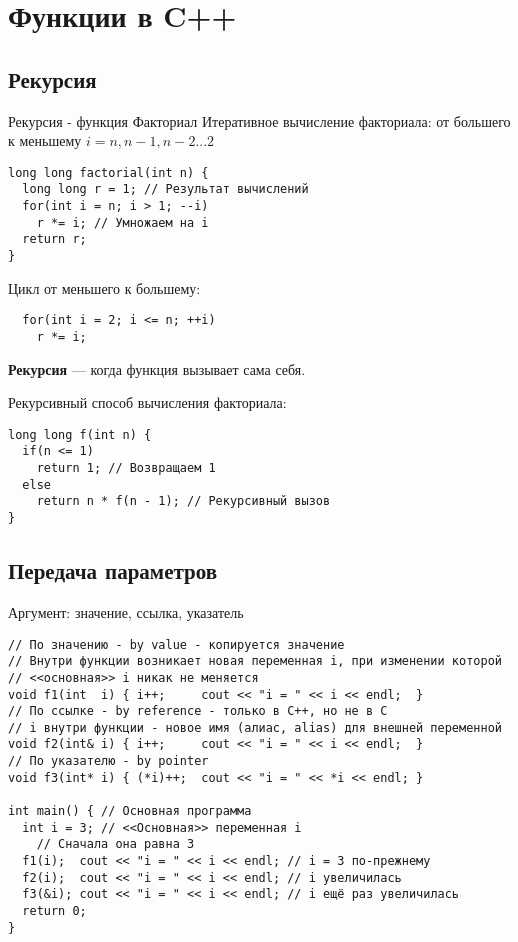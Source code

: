 \section{Функции в C++}

\subsection{Рекурсия}
\begin{frame}[t,fragile]{Рекурсия - функция Факториал}
Итеративное вычисление факториала: от большего к меньшему $i = n, n-1, n-2 ... 2$
\begin{lstlisting}
long long factorial(int n) {
  long long r = 1; // Результат вычислений
  for(int i = n; i > 1; --i)
    r *= i; // Умножаем на i
  return r;
}
\end{lstlisting}

Цикл от меньшего к большему:
\begin{lstlisting}
  for(int i = 2; i <= n; ++i)
    r *= i;
\end{lstlisting}

\textbf{Рекурсия} --- когда функция вызывает сама себя.

Рекурсивный способ вычисления факториала:
\begin{lstlisting}
long long f(int n) {
  if(n <= 1)
    return 1; // Возвращаем 1
  else
    return n * f(n - 1); // Рекурсивный вызов
}
\end{lstlisting}

\end{frame}

\subsection{Передача параметров}

\begin{frame}[t,fragile]{Аргумент: значение, ссылка, указатель}
\begin{lstlisting}
// По значению - by value - копируется значение
// Внутри функции возникает новая переменная i, при изменении которой
// <<основная>> i никак не меняется
void f1(int  i) { i++;     cout << "i = " << i << endl;  }
// По ссылке - by reference - только в C++, но не в C
// i внутри функции - новое имя (алиас, alias) для внешней переменной
void f2(int& i) { i++;     cout << "i = " << i << endl;  }
// По указателю - by pointer
void f3(int* i) { (*i)++;  cout << "i = " << *i << endl; }

int main() { // Основная программа
  int i = 3; // <<Основная>> переменная i
    // Сначала она равна 3
  f1(i);  cout << "i = " << i << endl; // i = 3 по-прежнему
  f2(i);  cout << "i = " << i << endl; // i увеличилась
  f3(&i); cout << "i = " << i << endl; // i ещё раз увеличилась
  return 0;
}
\end{lstlisting}
\end{frame}


